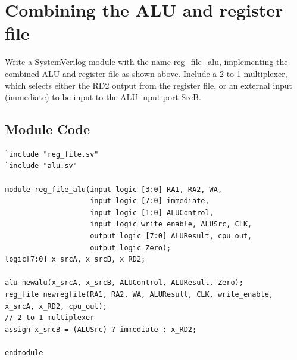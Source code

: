 \documentclass{article}
\begin{document}
\newpage
\section{Combining the ALU and register file}
Write a SystemVerilog module with the name reg\_file\_alu, implementing the combined ALU and register file as shown above.
Include a 2-to-1 multiplexer, which selects either the RD2 output from the register file, or an external input (immediate) to be input to the ALU input port SrcB.

\subsection{Module Code}
\begin{lstlisting}
`include "reg_file.sv"
`include "alu.sv"

module reg_file_alu(input logic [3:0] RA1, RA2, WA,
                    input logic [7:0] immediate,
                    input logic [1:0] ALUControl,
                    input logic write_enable, ALUSrc, CLK,
                    output logic [7:0] ALUResult, cpu_out,
                    output logic Zero);
logic[7:0] x_srcA, x_srcB, x_RD2;

alu newalu(x_srcA, x_srcB, ALUControl, ALUResult, Zero);
reg_file newregfile(RA1, RA2, WA, ALUResult, CLK, write_enable, x_srcA, x_RD2, cpu_out);
// 2 to 1 multiplexer
assign x_srcB = (ALUSrc) ? immediate : x_RD2;

endmodule
\end{lstlisting}
\end{document}
